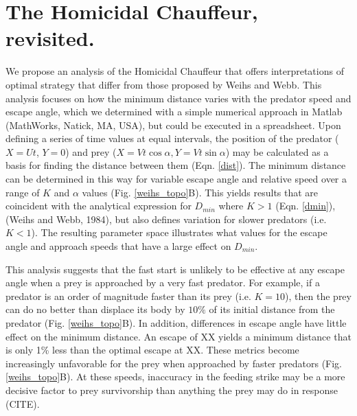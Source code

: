 \documentclass[12pt]{article}
\begin{document}
\section{The Homicidal Chauffeur, revisited.}

We propose an analysis of the Homicidal Chauffeur that offers interpretations of optimal strategy that differ from those proposed by Weihs and Webb. This analysis focuses on how the minimum distance varies with the predator speed and escape angle, which we determined with a simple numerical approach in Matlab (MathWorks, Natick, MA, USA), but could be executed in a spreadsheet. Upon defining a series of time values at equal intervals, the position of the predator ($X = Ut$, $Y = 0$) and prey ($X=Vt\cos\alpha,Y=Vt\sin\alpha$) may be calculated as a basis for finding the distance between them (Eqn. \ref{dist}). The minimum distance can be determined in this way for variable escape angle and relative speed over a range of $K$ and $\alpha$ values (Fig. \ref{weihs_topo}B). This yields results that are coincident with the analytical expression for $D_{min}$ where $K>1$ (Eqn. \ref{dmin}), (Weihs and Webb, 1984), but also defines variation for slower predators (i.e. $K<1$). The resulting parameter space illustrates what values for the escape angle and approach speeds that have a large effect on $D_{min}$.

This analysis suggests that the fast start is unlikely to be effective at any escape angle when a prey is approached by a very fast predator. For example, if a predator is an order of magnitude faster than its prey (i.e. $K=10$), then the prey can do no better than displace its body by $10\%$ of its initial distance from the predator (Fig. \ref{weihs_topo}B). In addition, differences in escape angle have little effect on the minimum distance. An escape of  XX\textdegree\hspace{2pt} yields a minimum distance that is only 1\% less than the optimal escape at XX\textdegree. These metrics become increasingly unfavorable for the prey when approached by faster predators (Fig. \ref{weihs_topo}B). At these speeds, inaccuracy in the feeding strike may be a more decisive factor to prey survivorship than anything the prey may do in response (CITE).
\end{document}

